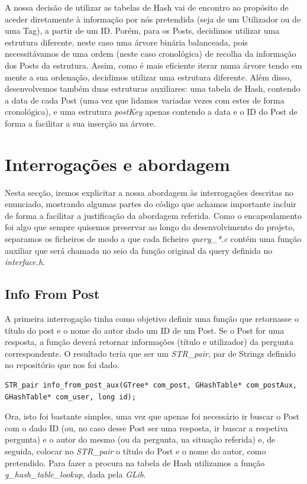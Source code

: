 \documentclass[a4paper, 11pt, oneside]{article}
\begin{document}
A nossa decisão de utilizar as tabelas de Hash vai de encontro ao propósito de aceder diretamente à informação por nós pretendida (seja de um Utilizador ou de uma Tag), a partir de um ID. Porém, para os Posts, decidimos utilizar uma estrutura diferente, neste caso uma árvore binária balanceada, pois necessitávamos de uma ordem (neste caso cronológica) de recolha da informação dos Posts da estrutura. Assim, como é mais eficiente iterar numa árvore tendo em mente a sua ordenação, decidimos utilizar uma estrutura diferente. Além disso, desenvolvemos também duas estruturas auxiliares: uma tabela de Hash, contendo a data de cada Post (uma vez que lidamos variadas vezes com estes de forma cronológica), e uma estrutura \textit{postKey} apenas contendo a data e o ID do Post de forma a facilitar a sua inserção na árvore.

\newpage
\section{Interrogações e abordagem}
\label{queries}
Nesta secção, iremos explicitar a nossa abordagem às interrogações descritas no enunciado, mostrando algumas partes do código que achamos importante incluir de forma a facilitar a justificação da abordagem referida. Como o encapsulamento foi algo que sempre quisemos preservar ao longo do desenvolvimento do projeto, separamos os ficheiros de modo a que cada ficheiro \textit{query\_*.c} contém uma função auxiliar que será chamada no seio da função original da query definida no \textit{interface.h}.

\subsection{Info From Post}
A primeira interrogação tinha como objetivo definir uma função que retornasse o título do post e o nome do autor dado um ID de um Post. Se o Post for uma resposta, a função deverá retornar informações (título e utilizador) da pergunta correspondente. O resultado teria que ser um \textit{STR\_pair}, par de Strings definido no repositório que nos foi dado.

\begin{lstlisting}[caption=Query 1 - tipo função auxiliar]
STR_pair info_from_post_aux(GTree* com_post, GHashTable* com_postAux, GHashTable* com_user, long id);
\end{lstlisting}

Ora, isto foi bastante simples, uma vez que apenas foi necessário ir buscar o Post com o dado ID (ou, no caso desse Post ser uma resposta, ir buscar a respetiva pergunta) e o autor do mesmo (ou da pergunta, na situação referida) e, de seguida, colocar no \textit{STR\_pair} o título do Post e o nome do autor, como pretendido. Para fazer a procura na tabela de Hash utilizamos a função \textit{g\_hash\_table\_lookup}, dada pela \textit{GLib}.
\end{document}
